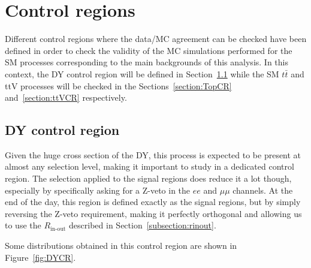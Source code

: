 \documentclass[a4paper, 10pt, openright]{report}
\begin{document}
\section{Control regions} \label{section:CR}

Different control regions where the data/\ac{MC} agreement can be checked have been defined in order to check the validity of the \ac{MC} simulations performed for the \ac{SM} processes corresponding to the main backgrounds of this analysis. In this context, the \ac{DY} control region will be defined in Section~\ref{section:DYCR} while the \ac{SM} $t \bar t$ and ttV processes will be checked in the Sections~\ref{section:TopCR} and~\ref{section:ttVCR} respectively.

\subsection{\acs{DY} control region} \label{section:DYCR}

Given the huge cross section of the \ac{DY}, this process is expected to be present at almost any selection level, making it important to study in a dedicated control region. The selection applied to the signal regions does reduce it a lot though, especially by specifically asking for a Z-veto in the $ee$ and $\mu \mu$ channels. At the end of the day, this region is defined exactly as the signal regions, but by simply reversing the Z-veto requirement, making it perfectly orthogonal and allowing us to use the $R_{\text{in-out}}$ described in Section~\ref{subsection:rinout}. 

Some distributions obtained in this control region are shown in Figure~\ref{fig:DYCR}.
\end{document}
